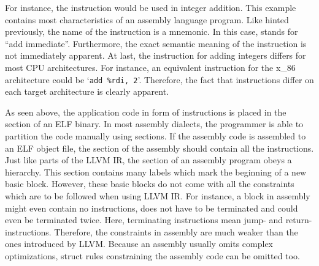 For instance, the \riscv{} instruction  would be used in integer addition.
This example contains most characteristics of an assembly language program.
Like hinted previously, the name of the instruction is a mnemonic.
In this case,  stands for \enquote{add immediate}.
Furthermore, the exact semantic meaning of the instruction is not immediately apparent.
At last, the instruction for adding integers differs for most CPU architectures.
For instance, an equivalent instruction for the x\_86 architecture could be `\texttt{add \%rdi, 2}'.
Therefore, the fact that instructions differ on each target architecture is clearly apparent.

As seen above, the application code in form of instructions is placed in the  section of an ELF binary.
In most assembly dialects, the programmer is able to partition the code manually using sections.
If the assembly code is assembled to an ELF object file, the  section of the assembly should contain all the instructions.
Just like parts of the LLVM IR, the  section of an assembly program obeys a hierarchy.
This section contains many labels which mark the beginning of a new basic block.
However, these basic blocks do not come with all the constraints which are to be followed when using LLVM IR\@.
For instance, a block in assembly might even contain no instructions, does not have to be terminated and could even be terminated twice.
Here, terminating instructions mean jump- and return-instructions.
Therefore, the constraints in assembly are much weaker than the ones introduced by LLVM\@.
Because an assembly usually omits complex optimizations, struct rules constraining the assembly code can be omitted too.

